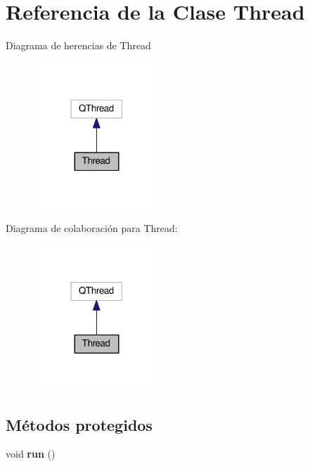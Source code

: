 \hypertarget{class_thread}{}\section{Referencia de la Clase Thread}
\label{class_thread}


Diagrama de herencias de Thread\nopagebreak
\begin{figure}[H]
\begin{center}
\leavevmode
\includegraphics[width=134pt]{class_thread__inherit__graph}
\end{center}
\end{figure}


Diagrama de colaboración para Thread\+:\nopagebreak
\begin{figure}[H]
\begin{center}
\leavevmode
\includegraphics[width=134pt]{class_thread__coll__graph}
\end{center}
\end{figure}
\subsection*{Métodos protegidos}
\begin{DoxyCompactItemize}
\item 
void {\bfseries run} ()\hypertarget{class_thread_ad9373d8d725c46717dfce3130018fe3a}{}\label{class_thread_ad9373d8d725c46717dfce3130018fe3a}

\end{DoxyCompactItemize}


